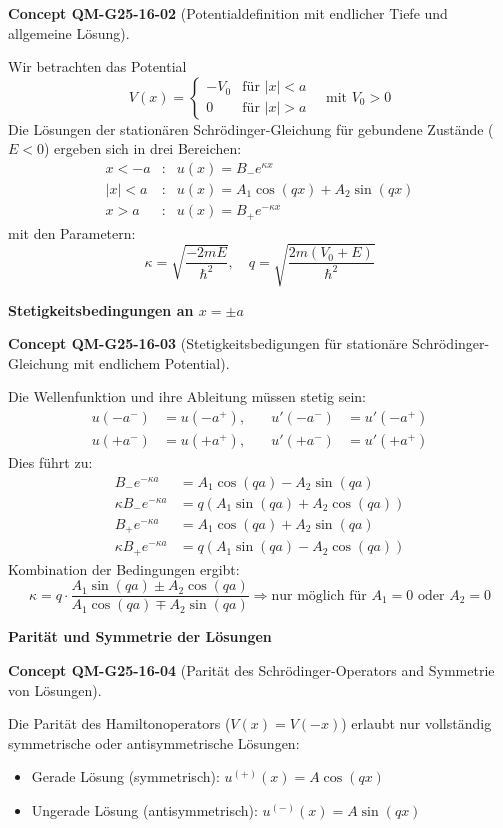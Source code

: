 \documentclass[10pt, letterpaper]{article}
\newcommand{\CustomHeading}[3]{%
  \par\medskip\noindent%
  \textbf{#1 #2} \textnormal{(#3)}.\enskip%
}
\newenvironment{CONC}[2]{\begin{unitbox}\CustomHeading{Concept}{#1}{#2}}{\end{unitbox}}
\begin{document}
\begin{CONC}{QM-G25-16-02}{Potentialdefinition mit endlicher Tiefe und allgemeine Lösung}
Wir betrachten das Potential
\[
V(x) = \begin{cases}
    -V_0 & \text{für } |x| < a \\
    0    & \text{für } |x| > a
\end{cases}
\quad \text{mit } V_0 > 0
\]
Die Lösungen der stationären Schrödinger-Gleichung für gebundene Zustände ($E<0$) ergeben sich in drei Bereichen:
\[
\begin{array}{rll}
x < -a       & : & u(x) = B_- e^{\kappa x} \\
|x| < a      & : & u(x) = A_1 \cos(qx) + A_2 \sin(qx) \\
x > a        & : & u(x) = B_+ e^{-\kappa x}
\end{array}
\]
mit den Parametern:
\[
\kappa = \sqrt{\frac{-2mE}{\hbar^2}}, \quad q = \sqrt{\frac{2m(V_0 + E)}{\hbar^2}}
\]
\end{CONC}



\textbf{Stetigkeitsbedingungen an $x = \pm a$}

\begin{CONC}{QM-G25-16-03}{Stetigkeitsbedigungen für stationäre Schrödinger-Gleichung mit endlichem Potential}
Die Wellenfunktion und ihre Ableitung müssen stetig sein:
\[
\begin{aligned}
u(-a^-) &= u(-a^+), &\quad u'(-a^-) &= u'(-a^+) \\
u(+a^-) &= u(+a^+), &\quad u'(+a^-) &= u'(+a^+)
\end{aligned}
\]
Dies führt zu:
\[
\begin{aligned}
B_- e^{-\kappa a} &= A_1 \cos(qa) - A_2 \sin(qa) \\
\kappa B_- e^{-\kappa a} &= q (A_1 \sin(qa) + A_2 \cos(qa)) \\
B_+ e^{-\kappa a} &= A_1 \cos(qa) + A_2 \sin(qa) \\
\kappa B_+ e^{-\kappa a} &= q (A_1 \sin(qa) - A_2 \cos(qa))
\end{aligned}
\]
Kombination der Bedingungen ergibt:
\[
\kappa = q \cdot \frac{A_1 \sin(qa) \pm A_2 \cos(qa)}{A_1 \cos(qa) \mp A_2 \sin(qa)}
\Rightarrow \text{nur möglich für } A_1 = 0 \text{ oder } A_2 = 0
\]
\end{CONC}



\textbf{Parität und Symmetrie der Lösungen}

\begin{CONC}{QM-G25-16-04}{Parität des Schrödinger-Operators and Symmetrie von Lösungen}
Die Parität des Hamiltonoperators ($V(x) = V(-x)$) erlaubt nur vollständig symmetrische oder antisymmetrische Lösungen:
\begin{itemize}
\item Gerade Lösung (symmetrisch): \( u^{(+)}(x) = A \cos(qx) \)
\item Ungerade Lösung (antisymmetrisch): \( u^{(-)}(x) = A \sin(qx) \)
\end{itemize}
\end{CONC}
\end{document}
